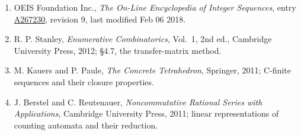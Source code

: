 \documentclass[11pt]{article}
\theoremstyle{definition}
\begin{document}
\begin{enumerate}

\item OEIS Foundation Inc., \emph{The On-Line Encyclopedia of Integer Sequences}, entry \href{https://oeis.org/A267230}{A267230}, revision 9, last modified Feb 06 2018.

\item R. P. Stanley, \emph{Enumerative Combinatorics}, Vol.~1, 2nd ed., Cambridge University Press, 2012; \S4.7, the transfer-matrix method.

\item M. Kauers and P. Paule, \emph{The Concrete Tetrahedron}, Springer, 2011; C-finite sequences and their closure properties.

\item J. Berstel and C. Reutenauer, \emph{Noncommutative Rational Series with Applications}, Cambridge University Press, 2011; linear representations of counting automata and their reduction.

\end{enumerate}
\end{document}
